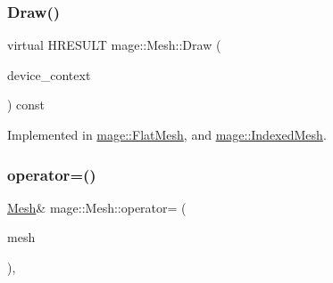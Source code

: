 \subsubsection{\texorpdfstring{Draw()}{Draw()}}
{\footnotesize\ttfamily virtual H\+R\+E\+S\+U\+LT mage\+::\+Mesh\+::\+Draw (\begin{DoxyParamCaption}\item[{I\+D3\+D11\+Device\+Context2 $\ast$}]{device\+\_\+context }\end{DoxyParamCaption}) const\hspace{0.3cm}{\ttfamily [pure virtual]}}



Implemented in \hyperlink{classmage_1_1_flat_mesh_abf73ceb1c98d4bd6925be6e6e087723b}{mage\+::\+Flat\+Mesh}, and \hyperlink{classmage_1_1_indexed_mesh_a6d8543f09c82b4d7e85c68daf39945ce}{mage\+::\+Indexed\+Mesh}.

\hypertarget{classmage_1_1_mesh_a5baf961af32b379671a59a082492bc5e}{}\label{classmage_1_1_mesh_a5baf961af32b379671a59a082492bc5e} 
\subsubsection{\texorpdfstring{operator=()}{operator=()}}
{\footnotesize\ttfamily \hyperlink{classmage_1_1_mesh}{Mesh}\& mage\+::\+Mesh\+::operator= (\begin{DoxyParamCaption}\item[{const \hyperlink{classmage_1_1_mesh}{Mesh} \&}]{mesh }\end{DoxyParamCaption})\hspace{0.3cm}{\ttfamily [private]}, {\ttfamily [delete]}}

